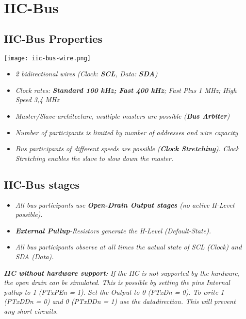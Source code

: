 \section{IIC-Bus}

\subsection{IIC-Bus Properties}

\texttt{[image: iic-bus-wire.png]}

\begin{itemize}
    \item{
        \textit{
            2 bidirectional wires (Clock: \textbf{SCL}, Data: \textbf{SDA})
        }
    }
    \item{
        \textit{
            Clock rates: \textbf{Standard 100 kHz; Fast 400 kHz}; Fast Plus 1 MHz;
            High Speed 3,4 MHz
        }
    }
    \item{
        \textit{
            Master/Slave-architecture, multiple masters are possible (\textbf{Bus Arbiter})
        }
    }
    \item{
        \textit{
            Number of participants is limited by number of addresses and wire capacity
        }
    }
    \item{
        \textit{
            Bus participants of different speeds are possible (\textbf{Clock Stretching}).
            Clock Stretching enables the slave to slow down the master.
        }
    }
\end{itemize}

\subsection{IIC-Bus stages}

\begin{itemize}
    \item{
        \textit{
            All bus participants use \textbf{Open-Drain Output stages}
            (no active H-Level possible).
        }
    }
    \item{
        \textit{
            \textbf{External Pullup}-Resistors generate the H-Level (Default-State).
        }
    }
    \item{
        \textit{
            All bus participants observe at all times the actual state of SCL (Clock) and SDA (Data).
        }
    }
\end{itemize}

\textit{
    \textbf{IIC without hardware support:}\newline
    If the IIC is not supported by the hardware, the open drain
    can be simulated. This is possible by setting the pins Internal
    pullup to 1 (PTxPEn = 1). Set the Output to 0 (PTxDn = 0). To write 1 (PTxDDn = 0)
    and 0 (PTxDDn = 1) use the datadirection. This will prevent any short circuits.
}

